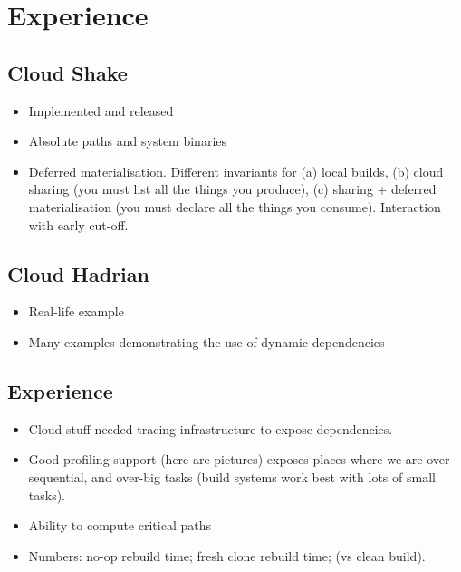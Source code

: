 \section{Experience}\label{sec-experience}


\subsection{Cloud Shake}

\begin{itemize}
\item Implemented and released
\item Absolute paths and system binaries
\item Deferred materialisation. Different invariants for (a) local builds, (b) cloud sharing (you must list all the things you produce), (c) sharing + deferred materialisation (you must declare all the things you consume). Interaction with early cut-off.
\end{itemize}

\subsection{Cloud Hadrian}

\begin{itemize}
\item  Real-life example
\item Many examples demonstrating the use of dynamic dependencies
\end{itemize}

\subsection{Experience}

\begin{itemize}
\item  Cloud stuff needed tracing infrastructure to expose dependencies.
\item  Good profiling support (here are pictures) exposes places where we are over-sequential, and over-big tasks (build systems work best with lots of small tasks).
\item Ability to compute critical paths
\item Numbers: no-op rebuild time; fresh clone rebuild time; (vs clean build).
\end{itemize}
